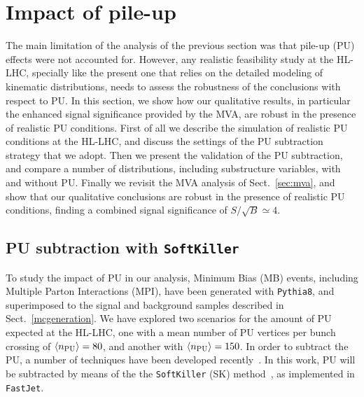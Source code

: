 \clearpage
\section{Impact of pile-up}

\label{sec:pileup}

The main limitation of the analysis of the previous section was that
pile-up (PU) effects were
not accounted for.
%
However, any realistic feasibility study at the HL-LHC, specially
like the present one that relies on the detailed modeling
of kinematic distributions, needs to assess the robustness of the conclusions
with respect to PU.
%
In this section, we show how our qualitative results, in particular
the enhanced signal significance provided by the MVA, are robust
in the presence of realistic PU conditions.
%
First of all we describe the simulation of realistic
PU conditions at the HL-LHC, and discuss the settings of
the PU subtraction strategy that we adopt.
%
Then we present the validation of the PU subtraction,
and compare a number of distributions, including substructure variables,
with and without PU.
%
Finally we revisit the MVA analysis of Sect.~\ref{sec:mva}, and
show that our qualitative conclusions are robust
in the presence of realistic PU conditions, finding
a combined
signal significance of $S/\sqrt{B}\simeq 4$.


\subsection{PU subtraction with {\tt SoftKiller}}

To study the impact of PU in our analysis,
Minimum Bias (MB) events,
including Multiple Parton Interactions (MPI), have been generated
with {\tt Pythia8}, and
superimposed to the signal
and background samples described in Sect.~\ref{mcgeneration}.
%
We have explored two scenarios for the amount of PU expected
at the HL-LHC, one with a mean number of
PU vertices per bunch crossing of $\left\langle n_{\rm PU}\right\rangle=80$, and another
with $\left\langle n_{\rm PU}\right\rangle=150$.
%
In order to subtract the PU, a number of techniques
have been developed
recently~\cite{Cacciari:2009dp,TheATLAScollaboration:2013pia,Butterworth:2008iy,Cacciari:2007fd,Krohn:2009th,Krohn:2013lba,Ellis:2009me,Bertolini:2014bba,Cacciari:2014gra,Cacciari:2014jta,Berta:2014eza,Larkoski:2014wba}.
%
In this work, PU  will be subtracted by means
of the the {\tt SoftKiller} (SK)
method~\cite{Cacciari:2014gra}, as implemented in {\tt FastJet}.
%

